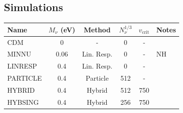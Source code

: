 \documentclass[useAMS, usenatbib]{mnras}
\begin{document}
\subsection{Simulations}
\label{sec:simulations}

\begin{table}
\begin{center}
\begin{tabular}{|l|c|c|c|c|l|}
\hline
    Name & $M_\nu$ (eV) & Method & $N_\nu^{1/3}$ & $v_\mathrm{crit}$ & Notes \\
\hline
CDM    &       0             &    -          & 0         & - &    \\
MINNU    &     0.06            &   Lin. Resp.    & 0         & - &  NH  \\
LINRESP    &     0.4             &   Lin. Resp.    & 0         & - &    \\
PARTICLE    &     0.4             &   Particle    & 512       & - &    \\
HYBRID    &     0.4             &   Hybrid      & 512       & 750 & \\
HYBSING    &     0.4             &   Hybrid      & 256       & 750 & \\

\end{tabular}
\end{center}
\end{table}
\end{document}

